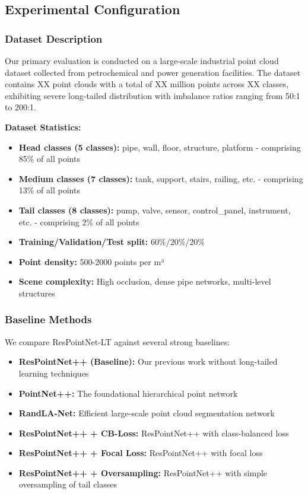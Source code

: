 \documentclass[preprint,12pt]{elsarticle}
\begin{document}
\subsection{Experimental Configuration}
\label{sec:exp_config}

\subsubsection{Dataset Description}
Our primary evaluation is conducted on a large-scale industrial point cloud dataset collected from petrochemical and power generation facilities. The dataset contains XX point clouds with a total of XX million points across XX classes, exhibiting severe long-tailed distribution with imbalance ratios ranging from 50:1 to 200:1.

\textbf{Dataset Statistics:}
\begin{itemize}
    \item \textbf{Head classes (5 classes):} pipe, wall, floor, structure, platform - comprising 85\% of all points
    \item \textbf{Medium classes (7 classes):} tank, support, stairs, railing, etc. - comprising 13\% of all points  
    \item \textbf{Tail classes (8 classes):} pump, valve, sensor, control\_panel, instrument, etc. - comprising 2\% of all points
    \item \textbf{Training/Validation/Test split:} 60\%/20\%/20\%
    \item \textbf{Point density:} 500-2000 points per m³
    \item \textbf{Scene complexity:} High occlusion, dense pipe networks, multi-level structures
\end{itemize}

\subsubsection{Baseline Methods}
We compare ResPointNet-LT against several strong baselines:
\begin{itemize}
    \item \textbf{ResPointNet++ (Baseline):} Our previous work without long-tailed learning techniques
    \item \textbf{PointNet++:} The foundational hierarchical point network
    \item \textbf{RandLA-Net:} Efficient large-scale point cloud segmentation network
    \item \textbf{ResPointNet++ + CB-Loss:} ResPointNet++ with class-balanced loss
    \item \textbf{ResPointNet++ + Focal Loss:} ResPointNet++ with focal loss
    \item \textbf{ResPointNet++ + Oversampling:} ResPointNet++ with simple oversampling of tail classes
\end{itemize}
\end{document}
